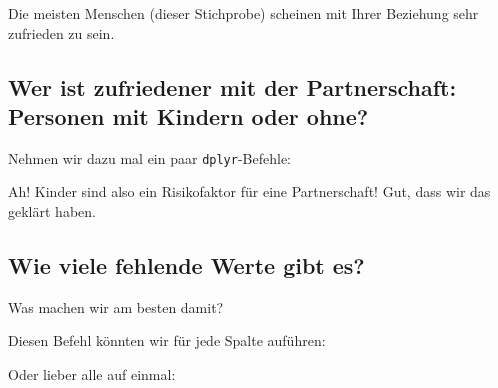 \documentclass[12pt,ngerman,]{book}
\newenvironment{Shaded}{\begin{snugshade}}{\end{snugshade}}
\newcommand{\KeywordTok}[1]{\textcolor[rgb]{0.13,0.29,0.53}{\textbf{{#1}}}}
\newcommand{\DataTypeTok}[1]{\textcolor[rgb]{0.13,0.29,0.53}{{#1}}}
\newcommand{\StringTok}[1]{\textcolor[rgb]{0.31,0.60,0.02}{{#1}}}
\newcommand{\CommentTok}[1]{\textcolor[rgb]{0.56,0.35,0.01}{\textit{{#1}}}}
\newcommand{\NormalTok}[1]{{#1}}
\renewenvironment{Shaded}{\begin{kframe}}{\end{kframe}}
\begin{document}
Die meisten Menschen (dieser Stichprobe) scheinen mit Ihrer Beziehung
sehr zufrieden zu sein.

\subsection{Wer ist zufriedener mit der Partnerschaft: Personen mit
Kindern oder
ohne?}\label{wer-ist-zufriedener-mit-der-partnerschaft-personen-mit-kindern-oder-ohne}

Nehmen wir dazu mal ein paar \texttt{dplyr}-Befehle:

\begin{Shaded}
\end{Shaded}

Ah! Kinder sind also ein Risikofaktor für eine Partnerschaft! Gut, dass
wir das geklärt haben.

\subsection{Wie viele fehlende Werte gibt
es?}\label{wie-viele-fehlende-werte-gibt-es}

Was machen wir am besten damit?

Diesen Befehl könnten wir für jede Spalte auführen:

\begin{Shaded}
\end{Shaded}

Oder lieber alle auf einmal:

\begin{Shaded}
\end{Shaded}
\end{document}
